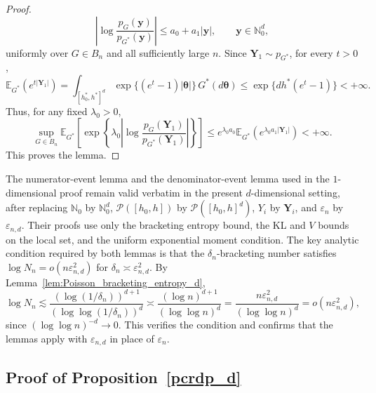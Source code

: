\documentclass[twoside,12pt]{article}
\newcommand{\E}{\mathds{E}}
\begin{document}
\begin{proof}
\begin{displaymath}
\left|\log\frac{p_G(\boldsymbol y)}{p_{G^\ast}(\boldsymbol y)}\right|\le a_0+a_1|\boldsymbol y|,\qquad\boldsymbol y\in\mathbb N_0^d,
\end{displaymath}
uniformly over $G\in B_n$ and all sufficiently large $n$. Since $\boldsymbol Y_1\sim p_{G^\ast}$, for every $t>0$,
\begin{displaymath}
\E_{G^\ast}(e^{t|\boldsymbol Y_1|})=\int_{[h_0^\ast,h^\ast]^d}\exp\{(e^t-1)|\boldsymbol\theta|\}\,G^\ast(d\boldsymbol\theta)\le\exp\{dh^\ast(e^t-1)\}<+\infty.
\end{displaymath}
Thus, for any fixed $\lambda_0>0$,
\begin{displaymath}
\sup_{G\in B_n}\E_{G^\ast}\!\left[\exp\!\left\{\lambda_0\left|\log\frac{p_G(\boldsymbol Y_1)}{p_{G^\ast}(\boldsymbol Y_1)}\right|\right\}\right]\le e^{\lambda_0 a_0}
\E_{G^\ast}(e^{\lambda_0 a_1|\boldsymbol Y_1|})<+\infty .
\end{displaymath}
This proves the lemma.
\end{proof}

The numerator-event lemma and the denominator-event lemma used in the $1$-dimensional proof remain valid verbatim in the present $d$-dimensional setting, after replacing $\mathbb N_0$ by $\mathbb N_0^d$, $\mathcal P([h_0,h])$ by $\mathcal P([h_0,h]^d)$, $Y_i$ by $\boldsymbol Y_i$, and $\varepsilon_n$ by $\varepsilon_{n,d}$. Their proofs
use only the bracketing entropy bound, the KL and $V$ bounds on the local set, and the uniform exponential moment condition. The key analytic condition required by both lemmas is that the $\delta_n$-bracketing number satisfies $\log N_n=o(n\varepsilon_{n,d}^2)$ for $\delta_n\asymp\varepsilon_{n,d}^2$. By Lemma~\ref{lem:Poisson_bracketing_entropy_d},
\begin{displaymath}
\log N_n\lesssim\frac{(\log(1/\delta_n))^{d+1}}{(\log\log(1/\delta_n))^d}\asymp\frac{(\log n)^{d+1}}{(\log\log n)^d}=\frac{n\varepsilon_{n,d}^2}{(\log\log n)^d}=o(n\varepsilon_{n,d}^2),
\end{displaymath}
since $(\log\log n)^{-d}\to0$. This verifies the condition and confirms that the lemmas apply with $\varepsilon_{n,d}$ in place of $\varepsilon_n$.

\subsection{Proof of Proposition~\ref{pcrdp_d}}
\end{document}

